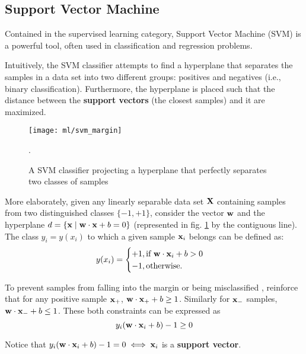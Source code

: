 \subsection{Support Vector Machine}

Contained in the supervised learning category, Support Vector Machine (SVM) is a powerful tool, often used in classification and regression problems.

Intuitively, the SVM classifier attempts to find a hyperplane that separates the samples in a data set into two different groups: positives and negatives (i.e., binary classification). Furthermore, the hyperplane is placed such that the distance between the \textbf{support vectors} (the closest samples) and it are maximized.

\begin{figure}[H]
	\centering
	\captionsetup{justification=centering}

	\texttt{[image: ml/svm\_margin]}
	\caption{A SVM classifier projecting a hyperplane that perfectly separates two classes of samples \cite{sksvm}}.
	\label{fig:svmmargin}
\end{figure}

More elaborately, given any linearly separable data set $\mathbf{X}$ containing samples from two distinguished classes $\{-1, +1\}$, consider the vector $\mathbf{w}$ and the hyperplane $d = \{\mathbf{x} \mid \mathbf{w} \cdot \mathbf{x} + b = 0\}$ (represented in fig. \ref{fig:svmmargin} by the contiguous line). The class $y_i = y(x_i)$ to which a given sample $\mathbf{x}_i$ belongs can be defined as:
\begin{align*}
	y(x_i) = \begin{cases}
		+1, \text{if } \mathbf{w} \cdot \mathbf{x}_i +b > 0 \\
		-1, \text{otherwise.}
	\end{cases}
\end{align*}

To prevent samples from falling into the margin or being misclassified \cite{wessvmdef}, reinforce that for any positive sample $\mathbf{x}_+$, $\mathbf{w} \cdot \mathbf{x}_+ +b \geq 1$. Similarly for $\mathbf{x}_-$ samples, $\mathbf{w} \cdot \mathbf{x}_- +b \leq 1$. These both constraints can be expressed as
\begin{equation} \label{svmconst}
y_i(\mathbf{w} \cdot \mathbf{x}_i +b) -1 \geq 0
\end{equation}

Notice that $y_i(\mathbf{w} \cdot \mathbf{x}_i +b) -1 = 0 \iff \mathbf{x}_i $ is a \textbf{support vector}.


